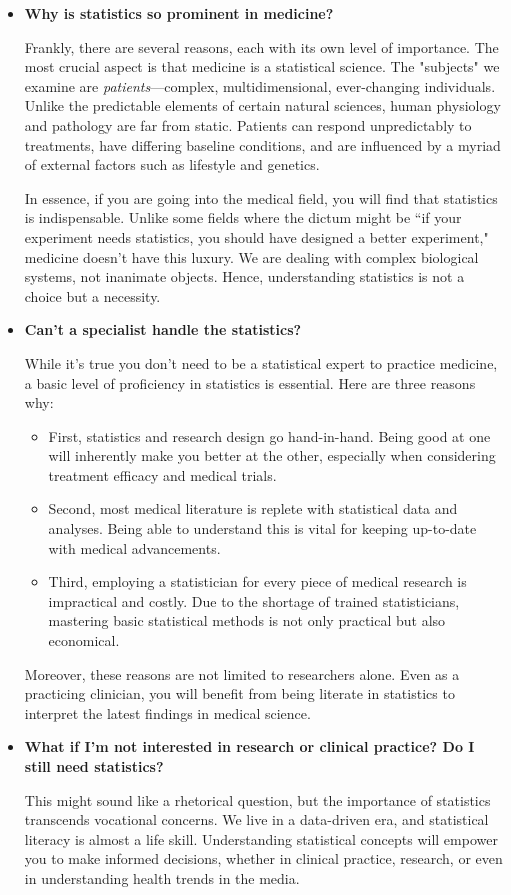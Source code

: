 \begin{itemize}

\item {\bf Why is statistics so prominent in medicine?}

Frankly, there are several reasons, each with its own level of importance. The most crucial aspect is that medicine is a statistical science. The "subjects" we examine are {\it patients}—complex, multidimensional, ever-changing individuals. Unlike the predictable elements of certain natural sciences, human physiology and pathology are far from static. Patients can respond unpredictably to treatments, have differing baseline conditions, and are influenced by a myriad of external factors such as lifestyle and genetics.

In essence, if you are going into the medical field, you will find that statistics is indispensable. Unlike some fields where the dictum might be ``if your experiment needs statistics, you should have designed a better experiment," medicine doesn't have this luxury. We are dealing with complex biological systems, not inanimate objects. Hence, understanding statistics is not a choice but a necessity.

\item {\bf Can't a specialist handle the statistics?}

While it's true you don't need to be a statistical expert to practice medicine, a basic level of proficiency in statistics is essential. Here are three reasons why:

\begin{itemize}
\item First, statistics and research design go hand-in-hand. Being good at one will inherently make you better at the other, especially when considering treatment efficacy and medical trials.
\item Second, most medical literature is replete with statistical data and analyses. Being able to understand this is vital for keeping up-to-date with medical advancements.
\item Third, employing a statistician for every piece of medical research is impractical and costly. Due to the shortage of trained statisticians, mastering basic statistical methods is not only practical but also economical.
\end{itemize}

\noindent
Moreover, these reasons are not limited to researchers alone. Even as a practicing clinician, you will benefit from being literate in statistics to interpret the latest findings in medical science.

\item {\bf What if I'm not interested in research or clinical practice? Do I still need statistics?}

This might sound like a rhetorical question, but the importance of statistics transcends vocational concerns. We live in a data-driven era, and statistical literacy is almost a life skill. Understanding statistical concepts will empower you to make informed decisions, whether in clinical practice, research, or even in understanding health trends in the media.

\end{itemize}



